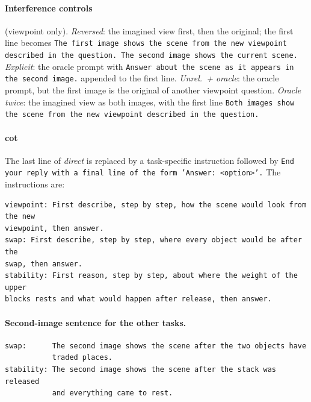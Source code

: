 \paragraph{Interference controls} (viewpoint only). \emph{Reversed}: the imagined view first, then the original; the first line becomes \texttt{The first image shows the scene from the new viewpoint described in the question. The second image shows the current scene.} \emph{Explicit}: the oracle prompt with \texttt{Answer about the scene as it appears in the second image.} appended to the first line. \emph{Unrel.\ + oracle}: the oracle prompt, but the first image is the original of another viewpoint question. \emph{Oracle twice}: the imagined view as both images, with the first line \texttt{Both images show the scene from the new viewpoint described in the question.}

\paragraph{cot} The last line of \emph{direct} is replaced by a task-specific instruction followed by \texttt{End your reply with a final line of the form 'Answer: <option>'.} The instructions are:
\begingroup\footnotesize\begin{verbatim}
viewpoint: First describe, step by step, how the scene would look from the new
viewpoint, then answer.
swap: First describe, step by step, where every object would be after the
swap, then answer.
stability: First reason, step by step, about where the weight of the upper
blocks rests and what would happen after release, then answer.
\end{verbatim}
\endgroup
\paragraph{Second-image sentence for the other tasks.}
\begingroup\footnotesize
\begin{verbatim}
swap:      The second image shows the scene after the two objects have
           traded places.
stability: The second image shows the scene after the stack was released
           and everything came to rest.
\end{verbatim}
\endgroup
